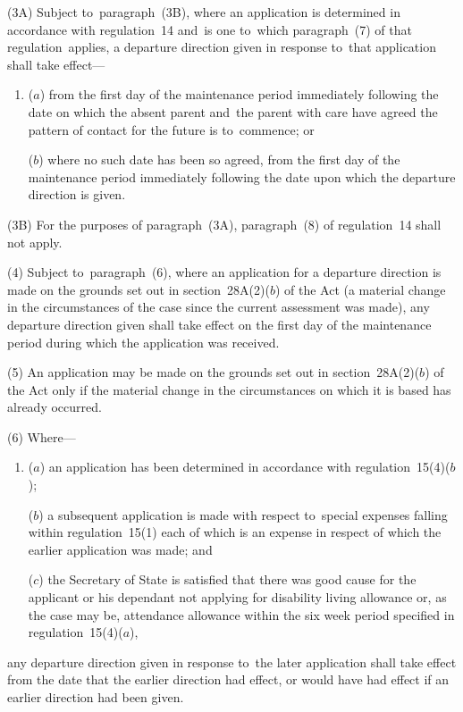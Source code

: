 \documentclass[12pt,a4paper]{article}
\begin{document}
(3A) 
Subject to~paragraph~(3B), where  %
an application is determined in accordance with regulation~14 and~is one to~which paragraph~(7) of that regulation~applies, a departure direction given in response to~that application shall take effect—
\begin{enumerate}\item[]
($a$) from the first day of the maintenance period immediately following the date on which the absent parent and~the parent with care have agreed the pattern of contact for the future is to~commence; or

($b$) where no such date has been so agreed, from the first day of the maintenance period immediately following the date upon which the departure direction is given.
\end{enumerate}

(3B) For the purposes of paragraph~(3A), paragraph~(8) of regulation~14 shall not apply.

(4) Subject to~paragraph~(6), where an application for a departure direction is
made on the grounds set out in section~28A(2)($b$) of the Act (a material change
in the circumstances of the case since the current assessment was made), any
departure direction given shall take effect on the first day of the maintenance
period during which the application was received.

(5) An application may be made on the grounds set out in section~28A(2)($b$) of
the Act only if the material change in the circumstances on which it is based
has already occurred.

(6) Where—
\begin{enumerate}\item[]
($a$) an application has been determined in accordance with regulation~15(4)($b$);

($b$) a subsequent application is made with respect to~special expenses falling
within regulation~15(1) each of which is an expense in respect of which the
earlier application was made; and

($c$) the Secretary of State is satisfied that there was good cause for the
applicant or his dependant not applying for disability living allowance or, as
the case may be, attendance allowance within the six week period specified in
regulation~15(4)($a$),
\end{enumerate}
any departure direction given in response to~the later application shall take
effect from the date that the earlier direction had effect, or would have had
effect if an earlier direction had been given.
\end{document}
